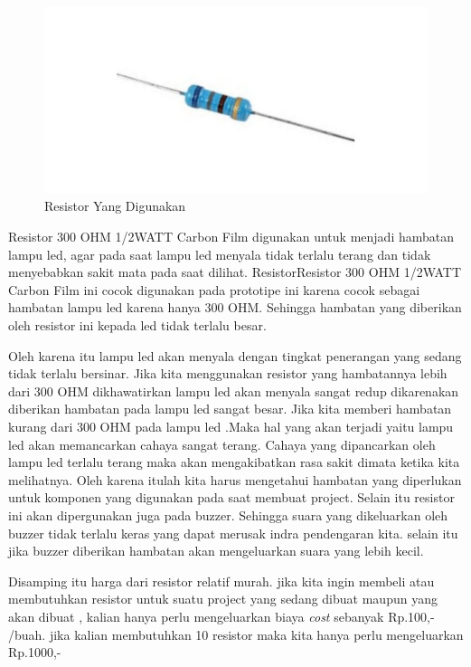 \begin{enumerate}
\begin{figure}[H]
\centering
\includegraphics[width=1.3\textwidth]{figures/resistor.jpg}
\caption{Resistor Yang Digunakan}
\label{print}
\end{figure}

\par Resistor 300 OHM 1/2WATT Carbon Film digunakan untuk menjadi hambatan lampu led, agar pada saat lampu led menyala tidak terlalu terang dan tidak menyebabkan sakit mata pada saat dilihat. ResistorResistor 300 OHM 1/2WATT Carbon Film ini cocok digunakan pada prototipe ini karena cocok sebagai hambatan lampu led karena hanya 300 OHM. Sehingga hambatan yang diberikan oleh resistor ini kepada led tidak terlalu besar.
\par Oleh karena itu lampu led akan menyala dengan tingkat penerangan yang sedang tidak terlalu bersinar. Jika kita menggunakan resistor yang hambatannya lebih dari 300 OHM dikhawatirkan lampu led akan menyala sangat redup dikarenakan diberikan hambatan pada lampu led sangat besar. Jika kita memberi hambatan kurang dari 300 OHM pada lampu led .Maka hal yang akan terjadi yaitu lampu led akan memancarkan cahaya sangat terang. Cahaya yang dipancarkan oleh lampu led terlalu terang maka akan mengakibatkan rasa sakit dimata ketika kita melihatnya. Oleh karena itulah kita harus mengetahui hambatan yang diperlukan untuk komponen yang digunakan pada saat membuat project. Selain itu resistor ini akan dipergunakan juga pada buzzer. Sehingga suara yang dikeluarkan oleh buzzer tidak terlalu keras yang dapat merusak indra pendengaran kita. selain itu jika buzzer diberikan hambatan akan mengeluarkan suara yang lebih kecil.

\par Disamping itu harga dari resistor relatif murah. jika kita ingin membeli atau membutuhkan resistor untuk suatu project yang sedang dibuat maupun yang akan dibuat , kalian hanya perlu mengeluarkan biaya \textit{cost} sebanyak Rp.100,- /buah. jika kalian membutuhkan 10 resistor maka kita hanya perlu mengeluarkan Rp.1000,-


\end{enumerate}
